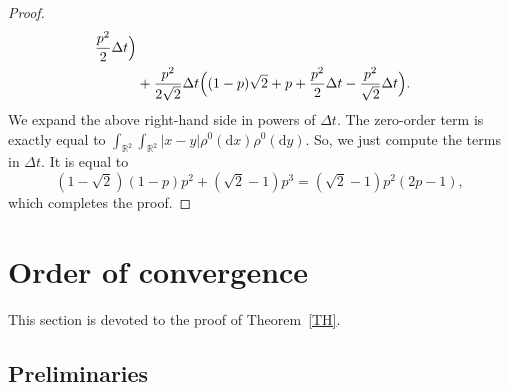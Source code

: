 \documentclass[11pt]{article}
\theoremstyle{definition}
\numberwithin{equation}{section}
\newcommand*{\dd}{\mathrm{d}}
\newcommand*{\dx}{\dd x}
\newcommand*{\dy}{\dd y}
\newcommand*\RR{\mathbb{R}}
\begin{document}
\begin{proof}
\begin{multline*}
\begin{aligned}
\frac{p^2}{2} \Delta t
\Bigr)
\\
& +
\frac{p^2}{2 \sqrt{2}} \Delta t
\Bigl((1-p) \sqrt{2} + p + \frac{p^2}{2} \Delta t - \frac{p^2}{\sqrt{2}} \Delta t
\Bigr).
\end{aligned}
\end{multline*}
We expand the above right-hand side in powers of $\Delta t$. The zero-order term is exactly equal to $\int_{\RR^2} \int_{\RR^2} \vert x-y \vert \rho^0(\dx) \rho^0(\dy)$. So, we just compute the terms in $\Delta t$. It is equal to
\begin{equation*}
(1- \sqrt{2}) (1-p) p^2 + (\sqrt{2}-1)p^3 = (\sqrt{2}-1) p^2 (2p-1),
\end{equation*}
which completes the proof.
\end{proof}



\section{Order of convergence}\label{sec:ordre}

This section is devoted to the proof of Theorem~\ref{TH}.

\subsection{Preliminaries}
\end{document}
